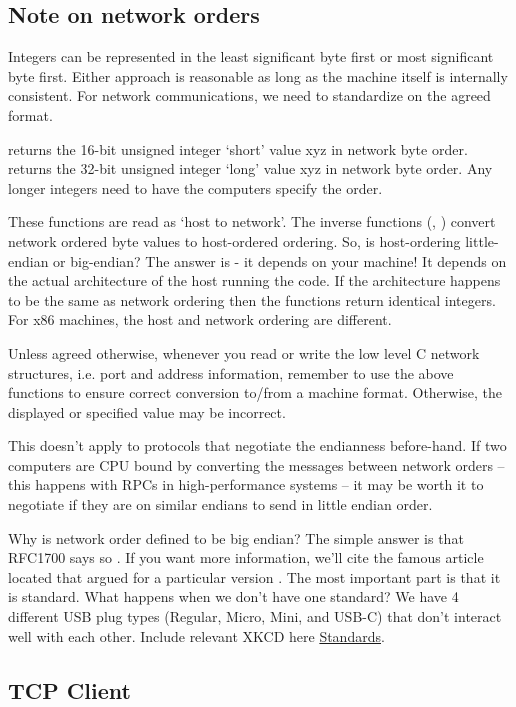 \subsection{Note on network orders}

Integers can be represented in the least significant byte first or most significant byte first.
Either approach is reasonable as long as the machine itself is internally consistent.
For network communications, we need to standardize on the agreed format.

 returns the 16-bit unsigned integer `short' value xyz in network byte order.
 returns the 32-bit unsigned integer `long' value xyz in network byte order.
Any longer integers need to have the computers specify the order.

These functions are read as `host to network'.
The inverse functions (, ) convert network ordered byte values to host-ordered ordering.
So, is host-ordering little-endian or big-endian?
The answer is - it depends on your machine!
It depends on the actual architecture of the host running the code.
If the architecture happens to be the same as network ordering then the functions return identical integers.
For x86 machines, the host and network ordering are different.

Unless agreed otherwise, whenever you read or write the low level C network structures, i.e. port and address information, remember to use the above functions to ensure correct conversion to/from a machine format.
Otherwise, the displayed or specified value may be incorrect.

This doesn't apply to protocols that negotiate the endianness before-hand.
If two computers are CPU bound by converting the messages between network orders -- this happens with RPCs in high-performance systems -- it may be worth it to negotiate if they are on similar endians to send in little endian order.

Why is network order defined to be big endian?
The simple answer is that RFC1700 says so \cite{RFC1700}.
If you want more information, we'll cite the famous article located that argued for a particular version \cite{cohen_1980}.
The most important part is that it is standard.
What happens when we don't have one standard?
We have 4 different USB plug types (Regular, Micro, Mini, and USB-C) that don't interact well with each other.
Include relevant XKCD here \href{https://xkcd.com/927/}{Standards}.

\subsection{TCP Client}

